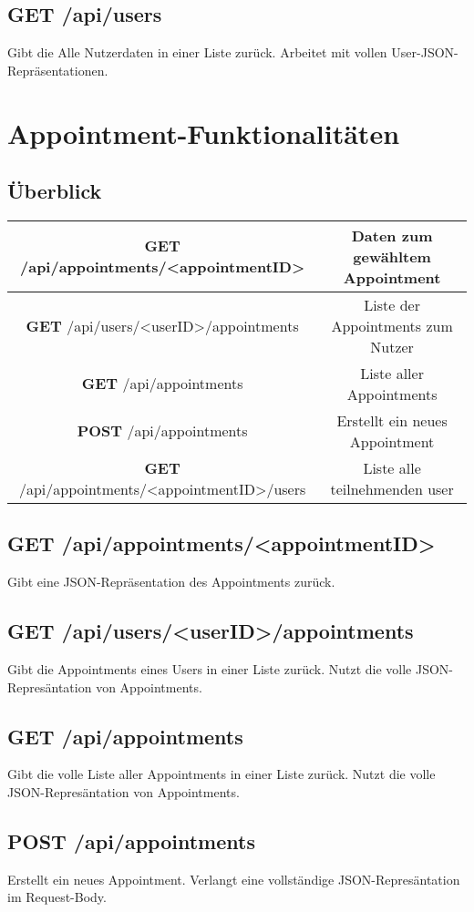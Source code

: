 \documentclass[11pt,a4paper]{article}
\begin{document}
\subsection{\textbf{GET} /api/users}
Gibt die Alle Nutzerdaten in einer Liste zurück. Arbeitet mit vollen User-JSON-Repräsentationen.
\section{Appointment-Funktionalitäten}
\subsection{Überblick}
\begin{tabular}{|c|c|}
\hline
\textbf{GET} /api/appointments/<appointmentID> & Daten zum gewähltem Appointment \\
\hline
\textbf{GET} /api/users/<userID>/appointments & Liste der Appointments zum Nutzer \\
\hline
\textbf{GET} /api/appointments & Liste aller Appointments \\
\hline
\textbf{POST} /api/appointments & Erstellt ein neues Appointment \\
\hline
\textbf{GET} /api/appointments/<appointmentID>/users & Liste alle teilnehmenden user \\
\hline
\end{tabular}

\subsection{\textbf{GET} /api/appointments/<appointmentID>}
Gibt eine JSON-Repräsentation des Appointments zurück.
\subsection{\textbf{GET} /api/users/<userID>/appointments}
Gibt die Appointments eines Users in einer Liste zurück. Nutzt die volle JSON-Represäntation von Appointments.
\subsection{\textbf{GET} /api/appointments}
Gibt die volle Liste aller Appointments in einer Liste zurück. Nutzt die volle JSON-Represäntation von Appointments.
\subsection{\textbf{POST} /api/appointments}
Erstellt ein neues Appointment. Verlangt eine vollständige JSON-Represäntation im Request-Body.
\end{document}
